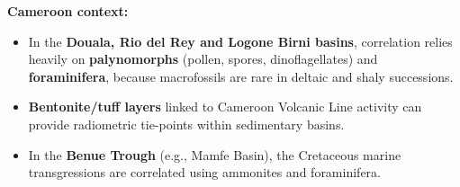 \documentclass[11pt]{article}
\begin{document}
\begin{methode}
\textbf{Cameroon context:}
\begin{itemize}
    \item In the \textbf{Douala, Rio del Rey and Logone Birni basins}, correlation relies heavily on \textbf{palynomorphs} (pollen, spores, dinoflagellates) and \textbf{foraminifera}, because macrofossils are rare in deltaic and shaly successions.
    \item \textbf{Bentonite/tuff layers} linked to Cameroon Volcanic Line activity can provide radiometric tie-points within sedimentary basins.
    \item In the \textbf{Benue Trough} (e.g., Mamfe Basin), the Cretaceous marine transgressions are correlated using ammonites and foraminifera.
\end{itemize}
\end{methode}
\end{document}
